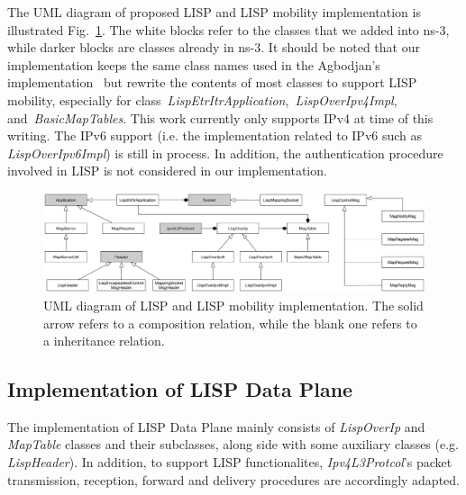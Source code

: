 The UML diagram of proposed LISP and LISP mobility implementation is illustrated Fig.~\ref{LISP_UML}. The white blocks refer to the classes that we added into ns-3, while darker blocks are classes already in ns-3. It should be noted that our implementation keeps the same class names used in the Agbodjan's implementation~\cite{lionel2016} but rewrite the contents of most classes to support LISP mobility, especially for class~\emph{LispEtrItrApplication},~\emph{LispOverIpv4Impl}, and~\emph{BasicMapTables}. %
This work currently only supports IPv4 at time of this writing. The IPv6 support (i.e. the implementation related to IPv6 such as \emph{LispOverIpv6Impl}) is still in process. In addition, the authentication procedure involved in LISP is not considered in our implementation.%
\begin{figure}[!t]
	\centering
	\includegraphics[width=\textwidth]{Pics/LISP_NS3_UML}
	\caption{UML diagram of LISP and LISP mobility implementation. The solid arrow refers to a composition relation, while the blank one refers to a inheritance relation.}
	\label{LISP_UML}
\end{figure}
\subsection{Implementation of LISP Data Plane}
\label{subsec:modifyInternet}
The implementation of LISP Data Plane mainly consists of \emph{LispOverIp} and \emph{MapTable} classes and their subclasses, along side with some auxiliary classes (e.g. \emph{LispHeader}). In addition, to support LISP functionalites, \emph{Ipv4L3Protcol}'s packet transmission, reception, forward and delivery procedures are accordingly adapted.
